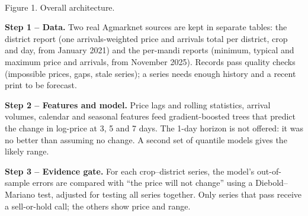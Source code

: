 \documentclass[11pt,a4paper]{article}
\begin{document}
\begin{center}
\\
{\small Figure 1. Overall architecture.}
\end{center}

\textbf{Step 1 -- Data.} Two real Agmarknet sources are kept in separate tables: the district report (one arrivals-weighted price and arrivals total per district, crop and day, from January 2021) and the per-mandi reports (minimum, typical and maximum price and arrivals, from November 2025). Records pass quality checks (impossible prices, gaps, stale series); a series needs enough history and a recent print to be forecast.

\textbf{Step 2 -- Features and model.} Price lags and rolling statistics, arrival volumes, calendar and seasonal features feed gradient-boosted trees that predict the change in log-price at 3, 5 and 7 days. The 1-day horizon is not offered: it was no better than assuming no change. A second set of quantile models gives the likely range.

\textbf{Step 3 -- Evidence gate.} For each crop--district series, the model's out-of-sample errors are compared with ``the price will not change'' using a Diebold--Mariano test, adjusted for testing all series together. Only series that pass receive a sell-or-hold call; the others show price and range.
\end{document}
